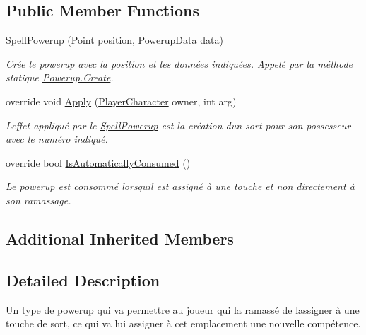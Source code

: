 \subsection*{Public Member Functions}
\begin{DoxyCompactItemize}
\item 
\hyperlink{class_tentacle_slicers_1_1powerups_1_1_spell_powerup_a31cbd8d21821ff284ba8b66f13903a5c}{Spell\+Powerup} (\hyperlink{class_tentacle_slicers_1_1general_1_1_point}{Point} position, \hyperlink{class_tentacle_slicers_1_1powerups_1_1_powerup_data}{Powerup\+Data} data)
\begin{DoxyCompactList}\small\item\em Crée le powerup avec la position et les données indiquées. Appelé par la méthode statique \hyperlink{class_tentacle_slicers_1_1powerups_1_1_powerup_a9aecde45bf218c2241b7454235e68050}{Powerup.\+Create}. \end{DoxyCompactList}\item 
override void \hyperlink{class_tentacle_slicers_1_1powerups_1_1_spell_powerup_a33b18ec95beafbdf151908c1aca562f9}{Apply} (\hyperlink{class_tentacle_slicers_1_1actors_1_1_player_character}{Player\+Character} owner, int arg)
\begin{DoxyCompactList}\small\item\em L\textquotesingle{}effet appliqué par le \hyperlink{class_tentacle_slicers_1_1powerups_1_1_spell_powerup}{Spell\+Powerup} est la création d\textquotesingle{}un sort pour son possesseur avec le numéro indiqué. \end{DoxyCompactList}\item 
override bool \hyperlink{class_tentacle_slicers_1_1powerups_1_1_spell_powerup_ac1193ef31fbde4059684e65cde3db500}{Is\+Automatically\+Consumed} ()
\begin{DoxyCompactList}\small\item\em Le powerup est consommé lorsqu\textquotesingle{}il est assigné à une touche et non directement à son ramassage. \end{DoxyCompactList}\end{DoxyCompactItemize}
\subsection*{Additional Inherited Members}


\subsection{Detailed Description}
Un type de powerup qui va permettre au joueur qui l\textquotesingle{}a ramassé de l\textquotesingle{}assigner à une touche de sort, ce qui va lui assigner à cet emplacement une nouvelle compétence. 



